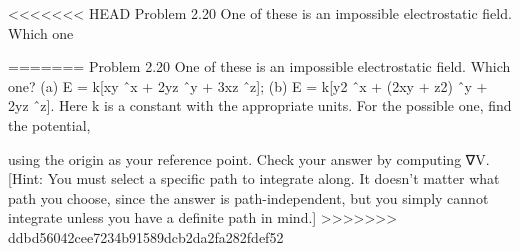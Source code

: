 \documentclass[12pt]{article}
\begin{document}

<<<<<<< HEAD
Problem 2.20 One of these is an impossible electrostatic field. Which one

=======
Problem 2.20 One of these is an impossible electrostatic field. Which one?
(a) E = k[xy ˆx + 2yz ˆy + 3xz ˆz];
(b) E = k[y2 ˆx + (2xy + z2) ˆy + 2yz ˆz].
Here k is a constant with the appropriate units. For the possible one, find the potential,

using the origin as your reference point. Check your answer by computing ∇V.
[Hint: You must select a specific path to integrate along. It doesn’t matter what path
you choose, since the answer is path-independent, but you simply cannot integrate
unless you have a definite path in mind.]
>>>>>>> ddbd56042cee7234b91589dcb2da2fa282fdef52






\end{document}
